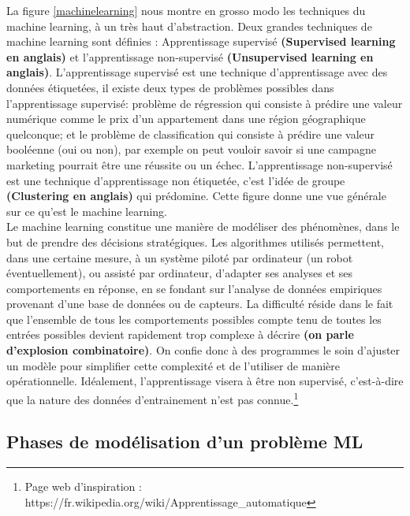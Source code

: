 \documentclass[12pt, french]{report}
\begin{document}
La figure \ref{machinelearning} nous montre en grosso modo les techniques du machine learning, à un très haut d'abstraction. Deux grandes techniques de machine learning sont définies : Apprentissage supervisé \textbf{(Supervised learning en anglais)} et l'apprentissage non-supervisé \textbf{(Unsupervised learning en anglais)}. L'apprentissage supervisé est une technique d'apprentissage avec des données étiquetées, il existe deux types de problèmes possibles dans l'apprentissage supervisé: problème de régression qui consiste à prédire une valeur numérique comme le prix d'un appartement dans une région géographique quelconque; et le problème de classification qui consiste à prédire une valeur booléenne (oui ou non), par exemple on peut vouloir savoir si une campagne marketing pourrait être une réussite ou un échec. L'apprentissage non-supervisé est une technique d'apprentissage non étiquetée, c'est l'idée de groupe \textbf{(Clustering en anglais)} qui prédomine.  Cette figure donne une vue générale sur ce qu'est le machine learning.\\

Le machine learning constitue une manière de modéliser des phénomènes, dans le but de prendre des décisions stratégiques. Les algorithmes utilisés permettent, dans une certaine mesure, à un système piloté par ordinateur (un robot éventuellement), ou assisté par ordinateur, d'adapter ses analyses et ses comportements en réponse, en se fondant sur l'analyse de données empiriques provenant d'une base de données ou de capteurs. La difficulté réside dans le fait que l'ensemble de tous les comportements possibles compte tenu de toutes les entrées possibles devient rapidement trop complexe à décrire \textbf{(on parle d'explosion combinatoire)}. On confie donc à des programmes le soin d'ajuster un modèle pour simplifier cette complexité et de l'utiliser de manière opérationnelle. Idéalement, l'apprentissage visera à être non supervisé, c'est-à-dire que la nature des données d'entrainement n'est pas connue.\footnote{Page web d'inspiration : https://fr.wikipedia.org/wiki/Apprentissage\_automatique}

\subsection{Phases de modélisation d'un problème ML}
\end{document}
